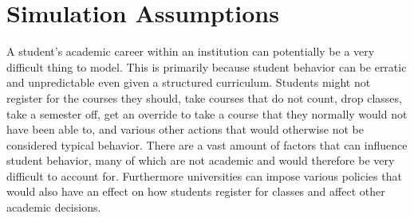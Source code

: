 \documentclass[botnum, fleqn]{unmeethesis}
\begin{document}


  \section{Simulation Assumptions}
    A student's academic career within an institution can potentially be a very difficult thing to model. This is primarily because student behavior can be erratic and unpredictable even given a structured curriculum. Students might not register for the courses they should, take courses that do not count, drop classes, take a semester off, get an override to take a course that they normally would not have been able to, and various other actions that would otherwise not be considered typical behavior. There are a vast amount of factors that can influence student behavior, many of which are not academic and would therefore be very difficult to account for. Furthermore universities can impose various policies that would also have an effect on how students register for classes and affect other academic decisions. 
\end{document}
